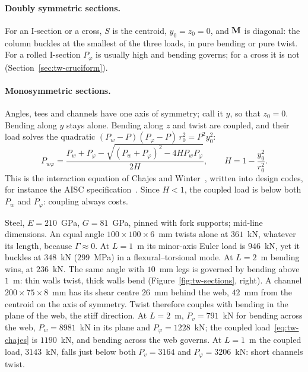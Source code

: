 \paragraph{Doubly symmetric sections.}
For an I-section or a cross, $S$ is the centroid, $y_0 = z_0 = 0$, and $\mathbf{M}$ is diagonal: the column
buckles at the smallest of the three loads, in pure bending or pure twist. For a rolled I-section
$P_\varphi$ is usually high and bending governs; for a cross it is not (Section~\ref{sec:tw-cruciform}).

\paragraph{Monosymmetric sections.}
%
Angles, tees and channels have one axis of symmetry; call it $y$, so that $z_0 = 0$. Bending along
$y$ stays alone. Bending along $z$ and twist are coupled, and their load solves the quadratic
$(P_w - P)(P_\varphi - P)\,r_0^2 = P^2y_0^2$:
\begin{equation}\label{eq:tw-chajes}
  P_{w\varphi} = \frac{P_w + P_\varphi - \sqrt{(P_w + P_\varphi)^2 - 4HP_wP_\varphi}}{2H} ,
  \qquad
  H = 1 - \frac{y_0^2}{r_0^2} .
\end{equation}
This is the interaction equation of Chajes and Winter~\cite{tw-chajes1965}, written into design
codes, for instance the AISC specification~\cite[Section~E4]{tw-aisc2022}. Since $H < 1$, the coupled load
is below both $P_w$ and $P_\varphi$: coupling always costs.

\begin{example}\label{ex:tw-struts}
%
Steel, $E = 210$~GPa, $G = 81$~GPa, pinned with fork supports; mid-line dimensions.
An equal angle $100\times100\times6$~mm twists alone at $361$~kN, whatever its length, because
$\Gamma \approx 0$. At $L = 1$~m its minor-axis Euler load is $946$~kN, yet it buckles at $348$~kN
($299$~MPa) in a flexural--torsional mode. At $L = 2$~m bending wins, at $236$~kN.
The same angle with $10$~mm legs is governed by bending above $1$~m: thin walls twist, thick walls bend
(Figure~\ref{fig:tw-sections}, right).
A channel $200\times75\times8$~mm has its shear centre $26$~mm behind the web, $42$~mm from the centroid on the
axis of symmetry. Twist therefore couples with bending in the plane of the web, the stiff direction. At
$L = 2$~m, $P_v = 791$~kN for bending across the web, $P_w = 8981$~kN in its plane and $P_\varphi = 1228$~kN; the
coupled load~\eqref{eq:tw-chajes} is $1190$~kN, and bending across the web governs. At $L = 1$~m the
coupled load, $3143$~kN, falls just below both $P_v = 3164$ and $P_\varphi = 3206$~kN: short channels twist.
\end{example}


